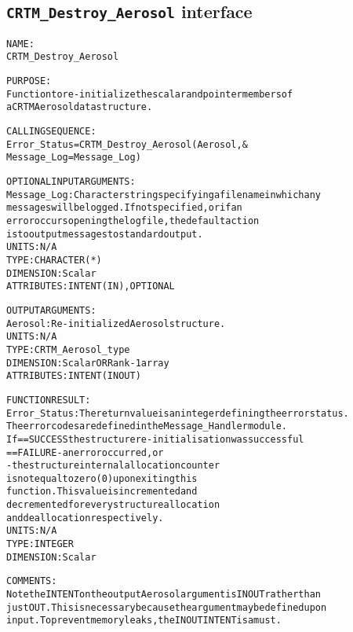 \subsection{\texttt{CRTM\_Destroy\_Aerosol} interface}
  \label{sec:CRTM_Destroy_Aerosol_interface}
  \begin{alltt}
 
  NAME:
        CRTM_Destroy_Aerosol
  
  PURPOSE:
        Function to re-initialize the scalar and pointer members of
        a CRTM Aerosol data structure.
 
  CALLING SEQUENCE:
        Error_Status = CRTM_Destroy_Aerosol( Aerosol                , &
                                             Message_Log=Message_Log  )
 
  OPTIONAL INPUT ARGUMENTS:
        Message_Log:  Character string specifying a filename in which any
                      messages will be logged. If not specified, or if an
                      error occurs opening the log file, the default action
                      is to output messages to standard output.
                      UNITS:      N/A
                      TYPE:       CHARACTER(*)
                      DIMENSION:  Scalar
                      ATTRIBUTES: INTENT(IN), OPTIONAL
 
  OUTPUT ARGUMENTS:
        Aerosol:      Re-initialized Aerosol structure.
                      UNITS:      N/A
                      TYPE:       CRTM_Aerosol_type
                      DIMENSION:  Scalar OR Rank-1 array
                      ATTRIBUTES: INTENT(IN OUT)
 
  FUNCTION RESULT:
        Error_Status: The return value is an integer defining the error status.
                      The error codes are defined in the Message_Handler module.
                      If == SUCCESS the structure re-initialisation was successful
                         == FAILURE - an error occurred, or
                                    - the structure internal allocation counter
                                      is not equal to zero (0) upon exiting this
                                      function. This value is incremented and
                                      decremented for every structure allocation
                                      and deallocation respectively.
                      UNITS:      N/A
                      TYPE:       INTEGER
                      DIMENSION:  Scalar
 
  COMMENTS:
        Note the INTENT on the output Aerosol argument is IN OUT rather than
        just OUT. This is necessary because the argument may be defined upon
        input. To prevent memory leaks, the IN OUT INTENT is a must.
 
  \end{alltt}
